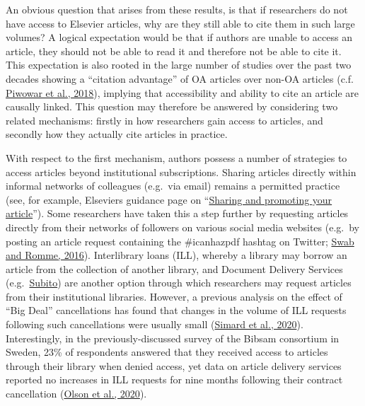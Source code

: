 \documentclass[
]{article}
\begin{document}
An obvious question that arises from these results, is that if researchers do not have access to Elsevier articles, why are they still able to cite them in such large volumes? A logical expectation would be that if authors are unable to access an article, they should not be able to read it and therefore not be able to cite it. This expectation is also rooted in the large number of studies over the past two decades showing a ``citation advantage'' of OA articles over non-OA articles (c.f. \href{https://doi.org/10.7717/peerj.4375}{Piwowar et al., 2018}), implying that accessibility and ability to cite an article are causally linked. This question may therefore be answered by considering two related mechanisms: firstly in how researchers gain access to articles, and secondly how they actually cite articles in practice.

With respect to the first mechanism, authors possess a number of strategies to access articles beyond institutional subscriptions. Sharing articles directly within informal networks of colleagues (e.g.~via email) remains a permitted practice (see, for example, Elsevier\textquotesingle s guidance page on ``\href{https://www.elsevier.com/authors/submit-your-paper/sharing-and-promoting-your-article}{Sharing and promoting your article}''). Some researchers have taken this a step further by requesting articles directly from their networks of followers on various social media websites (e.g.~by posting an article request containing the \#icanhazpdf hashtag on Twitter; \href{https://doi.org/10.5596/c16-009}{Swab and Romme, 2016}). Interlibrary loans (ILL), whereby a library may borrow an article from the collection of another library, and Document Delivery Services (e.g.~\href{https://www.subito-doc.de/?lang=en}{Subito}) are another option through which researchers may request articles from their institutional libraries. However, a previous analysis on the effect of ``Big Deal'' cancellations has found that changes in the volume of ILL requests following such cancellations were usually small (\href{https://arxiv.org/abs/2009.04287}{Simard et al., 2020}). Interestingly, in the previously-discussed survey of the Bibsam consortium in Sweden, 23\% of respondents answered that they received access to articles through their library when denied access, yet data on article delivery services reported no increases in ILL requests for nine months following their contract cancellation (\href{http://doi.org/10.1629/uksg.507}{Olson et al., 2020}).
\end{document}
